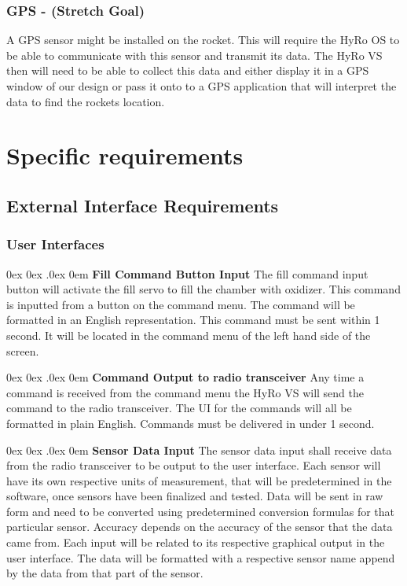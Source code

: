 \documentclass[10pt,draftclsnofoot,onecolumn,compsoc]{IEEEtran}
\makeatletter
\renewcommand\paragraph{\@startsection{paragraph}{4}{\z@}%
                                    {0ex \@plus0ex \@minus.0ex}%
                                    {0em}%
                                    {\normalfont\normalsize\bfseries}}
\makeatother
\begin{document}
\subsubsection{\bf GPS - (Stretch Goal)} A GPS sensor might be installed on the rocket. This will require the HyRo OS to be able to communicate with this sensor and transmit its data. The HyRo VS then will need to be able to collect this data and either display it in a GPS window of our design or pass it onto to a GPS application that will interpret the data to find the rockets location.

\section{ Specific requirements}
\subsection{External Interface Requirements}
\subsubsection{ User Interfaces}
\paragraph {\bf Fill Command Button Input}
The fill command input button will activate the fill servo to fill the chamber with oxidizer. This command is inputted from a button on the command menu. The command will be formatted in an English representation.  This command must be sent within 1 second. It will be located in the command menu of the left hand side of the screen.

\paragraph{\bf Command Output to radio transceiver}
	Any time a command is received from the command menu the HyRo VS will send the command to the radio transceiver. The UI for the commands will all be formatted in plain English. Commands must be delivered in under 1 second.

\paragraph{\bf Sensor Data Input}
The sensor data input shall receive data from the radio transceiver to be output to the user interface. Each sensor will have its own respective units of measurement, that will be predetermined in the software, once sensors have been finalized and tested. Data will be sent in raw form and need to be converted using predetermined conversion formulas for that particular sensor. Accuracy depends on the accuracy of the sensor that the data came from. Each input will be related to its respective graphical output in the user interface. The data will be formatted with a respective sensor name append by the data from that part of the sensor.
\end{document}
